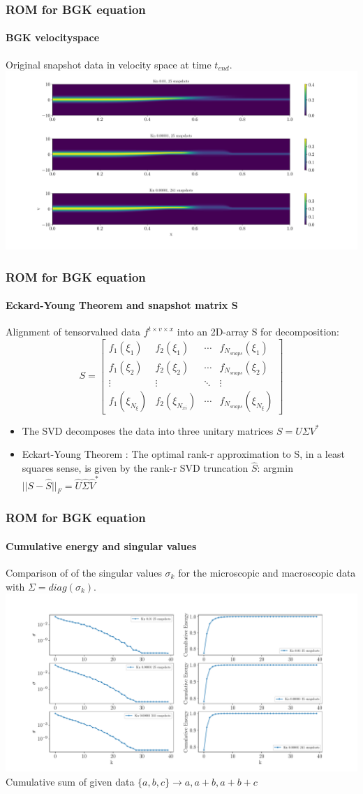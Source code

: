 \documentclass{beamer}
\begin{document}
\begin{frame}
	\frametitle{ROM for BGK equation}
	\framesubtitle{BGK velocityspace}
	Original snapshot data in velocity space at time $t_{end}$.
	\includegraphics[width=1.1\textwidth]{figures/VelocitySpace.pdf}
\end{frame}
\begin{frame}
	\frametitle{ROM for BGK equation}
	\framesubtitle{Eckard-Young Theorem and snapshot matrix S}
	Alignment of tensorvalued data $f^{t \times v \times x}$ into an 2D-array S for decomposition:
		\[S = \begin{bmatrix}
		f_{1}(\xi_{1})&f_{2}(\xi_{1})&\cdots &f_{N_{snaps}}(\xi_{1}) \\
		f_{1}(\xi_{2})&f_{2}(\xi_{2})&\cdots &f_{N_{snaps}}(\xi_{2}) \\
		\vdots & \vdots & \ddots & \vdots\\
		f_{1}(\xi_{N_{\xi}})&f_{2}(\xi_{N_{xi}})&\cdots &f_{N_{snaps}}(\xi_{N_{\xi}})
		\end{bmatrix}\]
		\begin{itemize}
			\item The SVD decomposes the data into three unitary matrices $S=U\Sigma V^{*}$
			\item Eckart-Young Theorem : The optimal rank-r approximation to S, in a least squares sense, is given by the rank-r SVD truncation $\hat{S}$: argmin $||S-\hat{S}||_{F}=\hat{U}\hat{\Sigma}\hat{V}^{*}$
		\end{itemize}
\end{frame}
\begin{frame}
		\frametitle{ROM for BGK equation}
		\framesubtitle{Cumulative energy and singular values}
		Comparison of of the singular values $\sigma_{k}$ for the microscopic and macroscopic data with $\Sigma = diag(\sigma_{k})$.
		\includegraphics[width=1.\linewidth]{figures/Cumulative_sum.pdf}
		Cumulative sum of given data $\{a,b,c\}\rightarrow a, a+b, a+b+c$
\end{frame}
\end{document}
